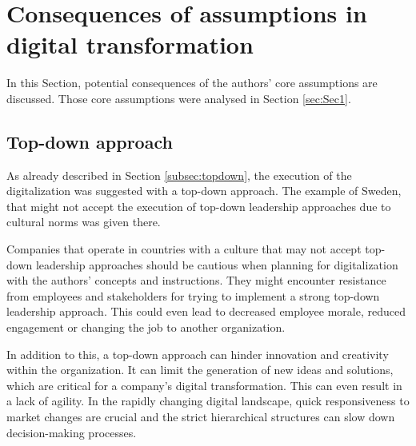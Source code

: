 \documentclass[a4]{scrartcl}
\begin{document}
\section{Consequences of assumptions in digital transformation} \label{sec:Sec2}

In this Section, potential consequences of the authors' core assumptions are discussed. Those core assumptions were analysed in Section \ref{sec:Sec1}.










\subsection{Top-down approach} \label{subsec:topdown_consequences}


As already described in Section \ref{subsec:topdown}, the execution of the digitalization was suggested with a top-down approach.
The example of Sweden, that might not accept the execution of top-down leadership approaches due to cultural norms was given there. \cite{lagom, nms}

Companies that operate in countries with a culture that may not accept top-down leadership approaches should be cautious when planning for digitalization with the authors' concepts and instructions.
They might encounter resistance from employees and stakeholders for trying to implement a strong top-down leadership approach. 
This could even lead to decreased employee morale, reduced engagement or changing the job to another organization.

In addition to this, a top-down approach can hinder innovation and creativity within the organization. It can limit the generation of new ideas and solutions, which are critical for a company's digital transformation.
This can even result in a lack of agility. In the rapidly changing digital landscape, quick responsiveness to market changes are crucial and the strict hierarchical structures can slow down decision-making processes. \cite{tdbu2}











\end{document}
